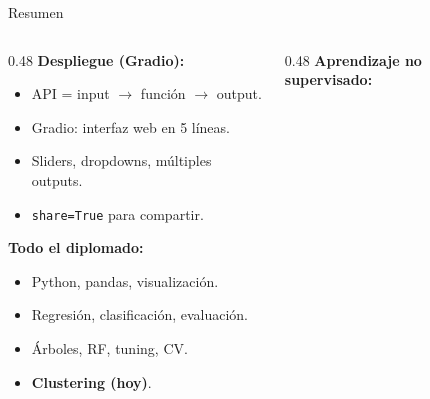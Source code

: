 \documentclass[aspectratio=169, 11pt]{beamer}
\begin{document}
\begin{frame}[shrink=10]{Resumen}
  \vspace{-4pt}
  \begin{columns}[T]
    \begin{column}{0.48\textwidth}
      {\footnotesize\bfseries\color{codePurple} Despliegue (Gradio):}
      \vspace{4pt}

      {\footnotesize
      \begin{itemize}\setlength{\itemsep}{3pt}
        \item[{\color{codeGreen}\faCheckCircle}]
          API = input $\to$ funci\'on $\to$ output.
        \item[{\color{codeGreen}\faCheckCircle}]
          Gradio: interfaz web en 5 l\'ineas.
        \item[{\color{codeGreen}\faCheckCircle}]
          Sliders, dropdowns, m\'ultiples outputs.
        \item[{\color{codeGreen}\faCheckCircle}]
          \texttt{share=True} para compartir.
      \end{itemize}
      }

      \vspace{4pt}
      {\footnotesize\bfseries\color{codeBlue} Todo el diplomado:}
      \vspace{4pt}

      {\footnotesize
      \begin{itemize}\setlength{\itemsep}{3pt}
        \item[{\color{codeBlue}\faCheckCircle}]
          Python, pandas, visualizaci\'on.
        \item[{\color{codeBlue}\faCheckCircle}]
          Regresi\'on, clasificaci\'on, evaluaci\'on.
        \item[{\color{codeBlue}\faCheckCircle}]
          \'Arboles, RF, tuning, CV.
        \item[{\color{codeGreen}\faCheckCircle}]
          \textbf{Clustering (hoy)}.
      \end{itemize}
      }
    \end{column}

    \begin{column}{0.48\textwidth}
      {\footnotesize\bfseries\color{arcaRed} Aprendizaje no supervisado:}
      \vspace{4pt}


\end{column}
\end{columns}
\end{frame}
\end{document}
